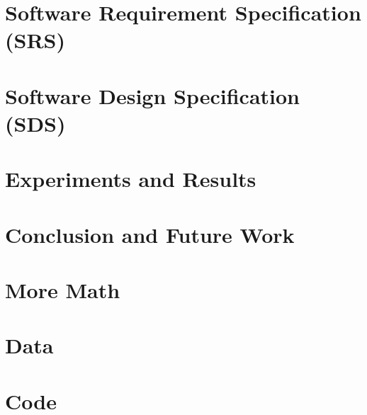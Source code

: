 \documentclass[12pt]{report}
\begin{document}
\chapter{Software Requirement Specification (SRS)}
\label{chap:srs}


\chapter{Software Design Specification (SDS)}
\label{chap:sds}


\chapter{Experiments and Results}
\label{chap:results}


\chapter{Conclusion and Future Work}
\label{chap:outro}


\begin{appendices}


\chapter{More Math}


\chapter{Data}


\chapter{Code}

\end{appendices}

\printbibliography[heading=bibintoc,title={References}]
\end{document}
